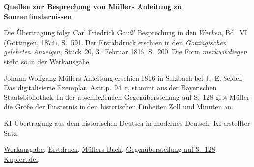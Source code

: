 \clearpage\thispagestyle{empty}
\begin{center}\Large\bfseries Quellen zur Besprechung von Müllers Anleitung zu Sonnenfinsternissen\end{center}

Die Übertragung folgt Carl Friedrich Gauß’ Besprechung in den \emph{Werken}, Bd.~VI (Göttingen, 1874), S.~591. Der Erstabdruck erschien in den \emph{Göttingischen gelehrten Anzeigen}, Stück~20, 3.~Februar 1816, S.~200. Die Form \emph{merkwürdiegen} steht so in der Werkausgabe.

Johann Wolfgang Müllers Anleitung erschien 1816 in Sulzbach bei J.~E. Seidel. Das digitalisierte Exemplar, Astr.p.~94~r, stammt aus der Bayerischen Staatsbibliothek. In der abschließenden Gegenüberstellung auf S.~128 gibt Müller die Größe der Finsternis in den historischen Einheiten Zoll und Minuten an.

KI-Übertragung aus dem historischen Deutsch in modernes Deutsch. KI-erstellter Satz.

\href{https://gdz.sub.uni-goettingen.de/id/PPN236007467}{Werkausgabe}. \href{https://images.p.sub.uni-goettingen.de/iiif/image/gdz:PPN319721507_1816:00000202/full/1650,/0/default.jpg}{Erstdruck}. \href{https://mdz-nbn-resolving.de/urn:nbn:de:bvb:12-bsb10060601-5}{Müllers Buch}. \href{https://api.digitale-sammlungen.de/iiif/image/v2/bsb10060601_00130/full/1500,/0/default.jpg}{Gegenüberstellung auf S.~128}. \href{https://api.digitale-sammlungen.de/iiif/image/v2/bsb10060601_00131/full/1500,/0/default.jpg}{Kupfertafel}.

\clearpage
